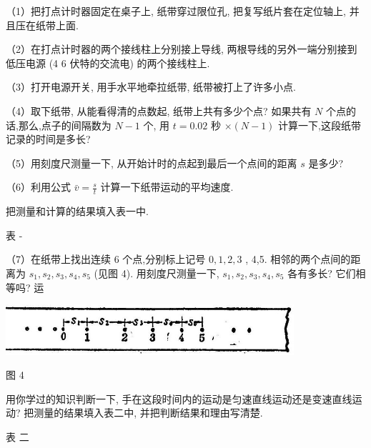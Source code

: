 \documentclass[10pt]{article}
\begin{document}
（1）把打点计时器固定在桌子上, 纸带穿过限位孔, 把复写纸片套在定位轴上, 并且压在纸带上面.

（2）在打点计时器的两个接线柱上分别接上导线, 两根导线的另外一端分别接到低压电源 (4 6 伏特的交流电) 的两个接线柱上.

（3）打开电源开关, 用手水平地牵拉纸带, 纸带被打上了许多小点.

（4）取下纸带, 从能看得清的点数起, 纸带上共有多少个点? 如果共有 \(N\) 个点的话,那么,点子的间隔数为 \(N - 1\) 个, 用 \(t = {0.02}\) 秒 \(\times \left( {N - 1}\right)\) 计算一下,这段纸带记录的时间是多长?

（5）用刻度尺测量一下, 从开始计时的点起到最后一个点间的距离 \(s\) 是多少?

（6）利用公式 \(\bar{v} = \frac{s}{t}\) 计算一下纸带运动的平均速度.

把测量和计算的结果填入表一中.

表 -

\begin{center}
\end{center}

（7）在纸带上找出连续 6 个点,分别标上记号 \(0,1,2,3\) , 4,5. 相邻的两个点间的距离为 \({s}_{1},{s}_{2},{s}_{3},{s}_{4},{s}_{5}\) (见图 4). 用刻度尺测量一下, \({s}_{1},{s}_{2},{s}_{3},{s}_{4},{s}_{5}\) 各有多长? 它们相等吗? 运

\begin{center}
\includegraphics[max width=0.8\textwidth]{images/01912d55-147c-70aa-b0e0-1782a122f948_319_547536.jpg}
\end{center}

图 4

用你学过的知识判断一下, 手在这段时间内的运动是匀速直线运动还是变速直线运动? 把测量的结果填入表二中, 并把判断结果和理由写清楚.

表 二

\begin{center}
\end{center}
\end{document}

